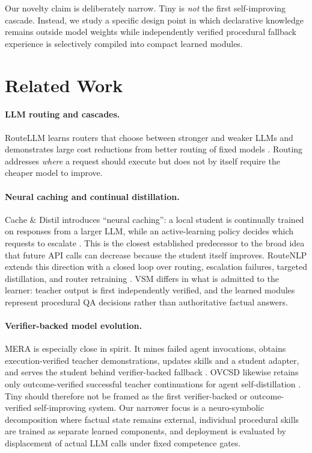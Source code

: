 \documentclass[10pt]{article}
\begin{document}
Our novelty claim is deliberately narrow. Tiny is \emph{not} the first self-improving cascade. Instead, we study a specific design point in which declarative knowledge remains outside model weights while independently verified procedural fallback experience is selectively compiled into compact learned modules.

\section{Related Work}

\paragraph{LLM routing and cascades.}
RouteLLM learns routers that choose between stronger and weaker LLMs and demonstrates large cost reductions from better routing of fixed models \cite{ong2024routellm}. Routing addresses \emph{where} a request should execute but does not by itself require the cheaper model to improve.

\paragraph{Neural caching and continual distillation.}
Cache \& Distil introduces ``neural caching'': a local student is continually trained on responses from a larger LLM, while an active-learning policy decides which requests to escalate \cite{ramirez2024cache}. This is the closest established predecessor to the broad idea that future API calls can decrease because the student itself improves. RouteNLP extends this direction with a closed loop over routing, escalation failures, targeted distillation, and router retraining \cite{guo2026routenlp}. VSM differs in what is admitted to the learner: teacher output is first independently verified, and the learned modules represent procedural QA decisions rather than authoritative factual answers.

\paragraph{Verifier-backed model evolution.}
MERA is especially close in spirit. It mines failed agent invocations, obtains execution-verified teacher demonstrations, updates skills and a student adapter, and serves the student behind verifier-backed fallback \cite{yao2026mera}. OVCSD likewise retains only outcome-verified successful teacher continuations for agent self-distillation \cite{xia2026ovcsd}. Tiny should therefore not be framed as the first verifier-backed or outcome-verified self-improving system. Our narrower focus is a neuro-symbolic decomposition where factual state remains external, individual procedural skills are trained as separate learned components, and deployment is evaluated by displacement of actual LLM calls under fixed competence gates.
\end{document}
